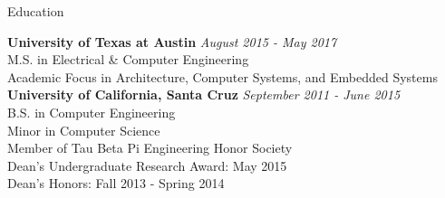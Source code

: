\documentclass{resume} %
\begin{document}

\begin{rSection}{Education}

{\bf University of Texas at Austin} \hfill {\em August 2015 - May 2017} \\
M.S. in Electrical \& Computer Engineering \\
Academic Focus in Architecture, Computer Systems, and Embedded Systems \\

{\bf University of California, Santa Cruz} \hfill {\em September 2011 - June 2015} \\
B.S. in Computer Engineering \\
Minor in Computer Science \\
Member of Tau Beta Pi Engineering Honor Society \\
Dean's Undergraduate Research Award: May 2015 \\
Dean's Honors: Fall 2013 - Spring 2014 \\

\end{rSection}

\end{document}
